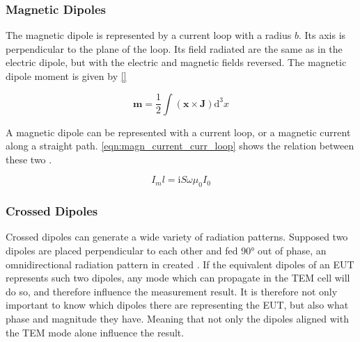 \subsubsection{Magnetic Dipoles}

The magnetic dipole is represented by a current loop with a radius $b$. Its axis is perpendicular to the plane of the loop. Its field radiated are the same as in the electric dipole, but with the electric and magnetic fields reversed\cite{Balanis_1997}. The magnetic dipole moment is given by \autoref{}

\begin{equation}
    \mathbf{m}=\frac{1}{2}\int (\mathbf{x} \times \mathbf{J})\mathrm{d}^3x
\end{equation}

A magnetic dipole can be represented with a current loop, or a magnetic current along a straight path. \autoref{eqn:magn_current_curr_loop} shows the relation between these two \cite{Balanis_1997}. 

\begin{equation}
    I_m l = \mathrm{i}S\omega\mu_0 I_0
    \label{eqn:magn_current_curr_loop}
\end{equation}


\subsubsection{Crossed Dipoles}


Crossed dipoles can generate a wide variety of radiation patterns. Supposed two dipoles are placed perpendicular to each other and fed 90° out of phase, an omnidirectional radiation pattern in created \cite{7293591}. If the equivalent dipoles of an EUT represents such two dipoles, any mode which can propagate in the TEM cell will do so, and therefore influence the measurement result. It is therefore not only important to know which dipoles there are representing the EUT, but also what phase and magnitude they have. Meaning that not only the dipoles aligned with the TEM mode alone influence the result. 


